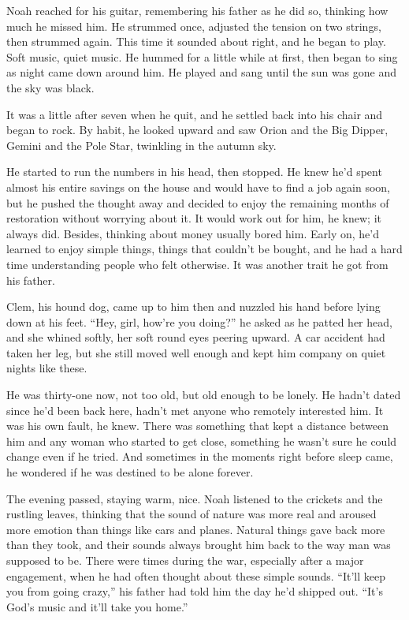 \documentclass[10pt, twoside, openright]{book}
\begin{document}
Noah reached for his guitar, remembering his father as he did so,
thinking how much he missed him. He strummed once, adjusted the tension
on two strings, then strummed again. This time it sounded about right,
and he began to play. Soft music, quiet music. He hummed for a little
while at first, then began to sing as night came down around him. He
played and sang until the sun was gone and the sky was black.

It was a little after seven when he quit, and he settled back into his
chair and began to rock. By habit, he looked upward and saw Orion and
the Big Dipper, Gemini and the Pole Star, twinkling in the autumn sky.

He started to run the numbers in his head, then stopped. He knew he'd
spent almost his entire savings on the house and would have to find a
job again soon, but he pushed the thought away and decided to enjoy the
remaining months of restoration without worrying about it. It would work
out for him, he knew; it always did. Besides, thinking about money
usually bored him. Early on, he'd learned to enjoy simple things, things
that couldn't be bought, and he had a hard time understanding people who
felt otherwise. It was another trait he got from his father.

Clem, his hound dog, came up to him then and nuzzled his hand before
lying down at his feet. ``Hey, girl, how're you doing?'' he asked as he
patted her head, and she whined softly, her soft round eyes peering
upward. A car accident had taken her leg, but she still moved well
enough and kept him company on quiet nights like these.

He was thirty-one now, not too old, but old enough to be lonely. He
hadn't dated since he'd been back here, hadn't met anyone who remotely
interested him. It was his own fault, he knew. There was something that
kept a distance between him and any woman who started to get close,
something he wasn't sure he could change even if he tried. And sometimes
in the moments right before sleep came, he wondered if he was destined
to be alone forever.

The evening passed, staying warm, nice. Noah listened to the crickets
and the rustling leaves, thinking that the sound of nature was more real
and aroused more emotion than things like cars and planes. Natural
things gave back more than they took, and their sounds always brought
him back to the way man was supposed to be. There were times during the
war, especially after a major engagement, when he had often thought
about these simple sounds. ``It'll keep you from going crazy,'' his
father had told him the day he'd shipped out. ``It's God's music and
it'll take you home.''
\end{document}
